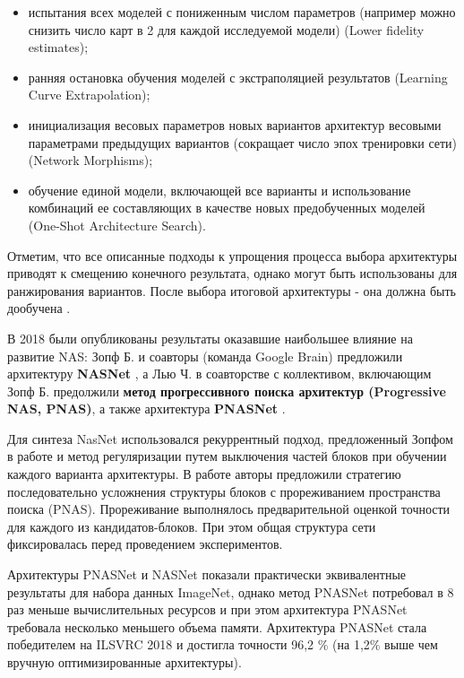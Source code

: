 \documentclass[12pt]{article}
\begin{document}
\begin{sloppypar}
\begin{itemize}
\begin{itemize}
        \item испытания всех моделей с пониженным числом параметров (например можно снизить число карт в 2 для каждой исследуемой модели) (Lower fidelity estimates); 
        \item ранняя остановка обучения моделей с экстраполяцией результатов (Learning Curve Extrapolation); 
        \item инициализация весовых параметров новых вариантов архитектур  весовыми параметрами предыдущих вариантов (сокращает число эпох тренировки сети) (Network Morphisms);
        \item обучение единой модели, включающей все варианты и использование комбинаций ее составляющих в качестве новых предобученных моделей (One-Shot Architecture Search).  
    \end{itemize}
    Отметим, что все описанные подходы к упрощения процесса выбора архитектуры приводят к смещению конечного результата, однако могут быть использованы для ранжирования вариантов. После выбора итоговой архитектуры - она должна быть дообучена \cite{elsken2019neural}.
\end{itemize}

В 2018 были опубликованы результаты оказавшие наибольшее влияние на развитие NAS: Зопф Б. и соавторы (команда Google Brain) предложили архитектуру \textbf{NASNet} \cite{zoph2018learning}, а Лью Ч. в соавторстве с коллективом, включающим Зопф Б. предолжили \textbf{метод прогрессивного поиска архитектур (Progressive NAS, PNAS)}, а также архитектура \textbf{PNASNet} \cite{liu2018progressive}. 

Для синтеза NasNet использовался рекуррентный подход, предложенный Зопфом в работе \cite{zoph2016neural} и метод регуляризации путем выключения частей блоков при обучении каждого варианта архитектуры. В работе \cite{liu2018progressive} авторы  предложили стратегию последовательно усложнения структуры блоков с прореживанием пространства поиска (PNAS). Прореживание выполнялось предварительной оценкой точности для каждого из кандидатов-блоков. При этом общая структура сети фиксировалась перед проведением экспериментов. 

Архитектуры PNASNet и NASNet показали практически эквивалентные результаты для набора данных ImageNet, однако метод PNASNet потребовал в 8 раз меньше вычислительных ресурсов и при этом архитектура PNASNet требовала несколько меньшего объема памяти.
Архитектура PNASNet стала победителем на ILSVRC 2018 и достигла точности 96,2 \% (на 1,2\% выше чем вручную оптимизированные архитектуры)\cite{liu2018progressive}.


\end{sloppypar}
\end{document}
